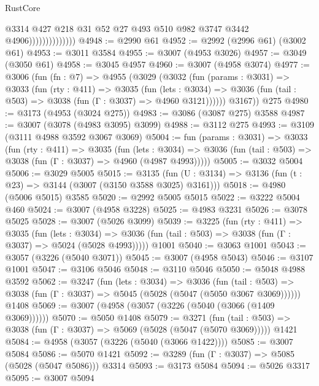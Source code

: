 \begin{lexlean}{RustCore}
\begin{coremodule}
                                @3314
                                @427
                                @218
                                @31
                                @52
                                @27
                                @493
                                @510
                                @982
                                @3747
                                @3442
                                @4906))))))))))))))
@4948 := @2990 @61
@4952 := @2992 (@2996 @61) (@3002 @61)
@4953 := @3011 @3584
@4955 := @3007 (@4953 @3026)
@4957 := @3049 (@3050 @61)
@4958 := @3045 @4957
@4960 := @3007 (@4958 @3074)
@4977 := @3006
    (fun (fn : @7) =>
    @4955
      (@3029
        (@3032
          (fun (params : @3031) =>
          @3033
            (fun (rty : @411) =>
            @3035
              (fun (lets : @3034) =>
              @3036 (fun (tail : @503) => @3038 (fun (Γ : @3037) => @4960 @3121))))))
        @3167))
    @275
@4980 := @3173 (@4953 (@3024 @275))
@4983 := @3086 (@3087 @275) @3588
@4987 := @3007 (@3078 (@4983 @3095) @3099)
@4988 := @3112 @275
@4993 := @3109 (@3111 @4988 @3592 @3067 @3069)
@5004 := fun (params : @3031) =>
  @3033
    (fun (rty : @411) =>
    @3035
      (fun (lets : @3034) =>
      @3036 (fun (tail : @503) => @3038 (fun (Γ : @3037) => @4960 (@4987 @4993)))))
@5005 := @3032 @5004
@5006 := @3029 @5005
@5015 := @3135 (fun (U : @3134) => @3136 (fun (t : @23) => @3144 (@3007 (@3150 @3588 @3025) @3161)))
@5018 := @4980 (@5006 @5015) @3585
@5020 := @2992 @5005 @5015
@5022 := @3222 @5004 @460
@5024 := @3007 (@4958 @3228)
@5025 := @4983 @3231
@5026 := @3078 @5025
@5028 := @3007 (@5026 @3099)
@5039 := @3225
    (fun (rty : @411) =>
    @3035
      (fun (lets : @3034) =>
      @3036 (fun (tail : @503) => @3038 (fun (Γ : @3037) => @5024 (@5028 @4993)))))
    @1001
@5040 := @3063 @1001
@5043 := @3057 (@3226 (@5040 @3071))
@5045 := @3007 (@4958 @5043)
@5046 := @3107 @1001
@5047 := @3106 @5046
@5048 := @3110 @5046
@5050 := @5048 @4988 @3592
@5062 := @3247
    (fun (lets : @3034) =>
    @3036
      (fun (tail : @503) => @3038 (fun (Γ : @3037) => @5045 (@5028 (@5047 (@5050 @3067 @3069))))))
    @1408
@5069 := @3007 (@4958 (@3057 (@3226 (@5040 (@3066 (@1409 @3069))))))
@5070 := @5050 @1408
@5079 := @3271
    (fun (tail : @503) => @3038 (fun (Γ : @3037) => @5069 (@5028 (@5047 (@5070 @3069)))))
    @1421
@5084 := @4958 (@3057 (@3226 (@5040 (@3066 @1422))))
@5085 := @3007 @5084
@5086 := @5070 @1421
@5092 := @3289 (fun (Γ : @3037) => @5085 (@5028 (@5047 @5086))) @3314
@5093 := @3173 @5084
@5094 := @5026 @3317
@5095 := @3007 @5094

\end{coremodule}
\end{lexlean}
